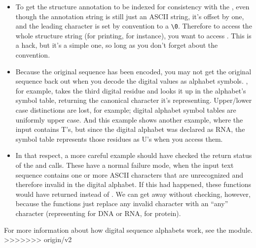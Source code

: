 \begin{itemize}
\item To get the structure annotation to be indexed  for
  consistency with the , even though the annotation string
  is still just an ASCII string, it's offset by one, and the leading
  character is set by convention to a \verb+\0+. Therefore to access
  the whole structure string (for printing, for instance), you want to
  access . This is a hack, but it's a simple one, so
  long as you don't forget about the convention.

\item Because the original sequence has been encoded, you may not get
  the original sequence back out when you decode the digital values as
  alphabet symbols. , for example, takes
  the third digital residue and looks it up in the alphabet's symbol
  table, returning the canonical character it's
  representing. Upper/lower case distinctions are lost, for example;
  digital alphabet symbol tables are uniformly upper case. And this
  example shows another example, where the input 
  contains T's, but since the digital alphabet was declared as RNA,
  the symbol table represents those residues as U's when you access
  them.

\item In that respect, a more careful example should have checked the
  return status of the  and
   calls. These have a normal failure
  mode, when the input text sequence contains one or more ASCII
  characters that are unrecognized and therefore invalid in the
  digital alphabet. If this had happened, these functions would have
  returned  instead of . We can get away
  without checking, however, because the functions just replace any
  invalid character with an ``any'' character (representing 
  for DNA or RNA,  for protein).
\end{itemize}

For more information about how digital sequence alphabets work, see
the  module.
>>>>>>> origin/v2
